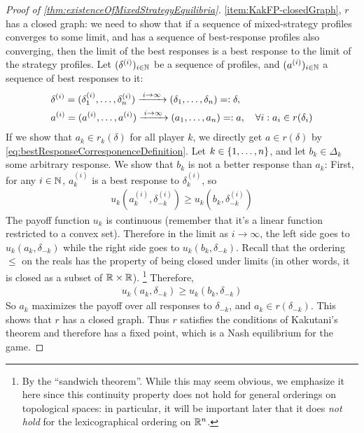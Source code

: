 \documentclass[a4paper]{scrreprt}
\begin{document}
\begin{proof}[Proof of \ref{thm:existenceOfMixedStrategyEquilibria}]
        \ref{item:KakFP-closedGraph}, $r$ has a closed graph: we need to show that if a sequence of mixed-strategy profiles converges to some limit, and has a sequence of best-response profiles also converging, then the limit of the best responses is a best response to the limit of the strategy profiles. Let $(\delta^{(i)})_{i \in \mathbb{N}}$ be a sequence of profiles, and $(a^{(i)})_{i \in \mathbb{N}}$ a sequence of best responses to it:
        \begin{align*}
            &\delta^{(i)} = (\delta_1^{(i)}, \dots, \delta_n^{(i)}) \xrightarrow{\;i \to \infty\;} (\delta_1, \dots, \delta_n) =: \delta, \\
            &a^{(i)} = (a^{(i)}, \dots, a^{(i)}) \xrightarrow{\;i \to \infty\;} (a_1, \dots, a_n) =: a, \quad
            \forall i: a_i \in r(\delta_i)
        \end{align*}
        If we show that $a_k \in r_k(\delta)$ for all player $k$, we directly get $a \in r(\delta)$ by \eqref{eq:bestResponseCorresponenceDefinition}.
        Let $k \in \{1, \dots, n\}$, and let $b_k \in \Delta_k$ some arbitrary response. We show that $b_k$ is not a better response than $a_k$:
        First, for any $i \in \mathbb{N}$, $a^{(i)}_k$ is a best response to $\delta^{(i)}_k$, so
        \begin{gather*}
            u_k(a^{(i)}_k, \delta^{(i)}_{-k}) \geq u_k(b_k, \delta^{(i)}_{-k})
        \end{gather*}
        The payoff function $u_k$ is continuous (remember that it's a linear function restricted to a convex set). Therefore in the limit as $i \to \infty$, the left side goes to $u_k(a_k, \delta_{-k})$ while the right side goes to $u_k(b_k, \delta_{-k})$.
        Recall that the ordering $\leq$ on the reals has the property of being closed under limits (in other words, it is closed as a subset of $\mathbb{R} \times \mathbb{R}$).
        \footnote{By the “sandwich theorem”. While this may seem obvious, we emphasize it here since this continuity property does not hold for general orderings on topological spaces:
        in particular, it will be important later that it does \emph{not hold} for the lexicographical ordering on $\mathbb{R}^n$.}
        Therefore,
        \begin{gather*}
            u_k(a_k, \delta_{-k}) \geq u_k(b_k, \delta_{-k})
        \end{gather*}
        So $a_k$ maximizes the payoff over all responses to $\delta_{-k}$, and $a_k \in r(\delta_{-k})$. This shows that $r$ has a closed graph.
        Thus $r$ satisfies the conditions of Kakutani's theorem and therefore has a fixed point, which is a Nash equilibrium for the game.
    \end{proof}
    
\end{document}
